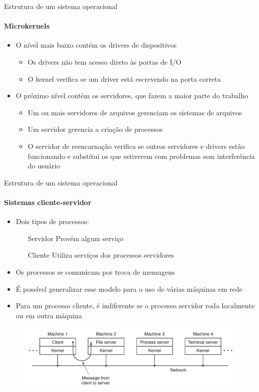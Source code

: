 \documentclass{beamer}
\begin{document}
\begin{frame}{Estrutura de um sistema operacional}
	\framesubtitle{Microkernels}
	\begin{itemize}
		\item O nível mais baixo contém os drivers de dispositivos
		\begin{itemize}
			\item Os drivers não tem acesso direto às portas de I/O
			\item O kernel verifica se um driver está escrevendo na porta correta
		\end{itemize}
		\item O próximo nível contém os \alert{servidores}, que fazem a maior parte do trabalho
		\begin{itemize}
			\item Um ou mais servidores de arquivos gerenciam os sistemas de arquivos
			\item Um servidor gerencia a criação de processos
			\item O servidor de reencarnação verifica se outros servidores e drivers estão funcionando e substitui os que estiverem com problemas sem interferência do usuário
		\end{itemize}
	\end{itemize}
\end{frame}
\begin{frame}{Estrutura de um sistema operacional}
	\framesubtitle{Sistemas cliente-servidor}
	\begin{itemize}
		\item Dois tipos de processos:
		\begin{itemize}
			\item[Servidor] Provém algum serviço
			\item[Cliente] Utiliza serviços dos processos servidores
		\end{itemize}
		\item Os processos se comunicam por troca de mensagens
		\item É possível generalizar esse modelo para o uso de várias máquinas em rede
		\item Para um processo cliente, é indiferente se o processo servidor roda localmente ou em outra máquina
	\end{itemize}
	\begin{figure}
		\includegraphics[width=0.7\paperwidth]{resources/client-server}
	\end{figure}
\end{frame}
\end{document}
